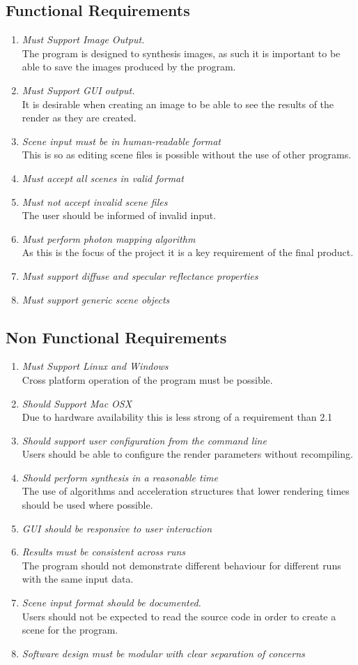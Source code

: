 \newcommand{\req}[2]
{
	\item {\it #1} \hfill \\ #2
}
  
\subsection{Functional Requirements}

\begin{enumerate}[{1}.1]
	\req{Must Support Image Output.}
	{
		The program is designed to synthesis images, as such it is important to be able to
		save the images produced by the program.
	}

	\req{Must Support GUI output.}
	{
		It is desirable when creating an image to be able to see the results of the render as they are created.
	}
	\req{Scene input must be in human-readable format}
	{
		This is so as editing scene files is possible without the use of other programs.
	}

	\req{Must accept all scenes in valid format}
	{
	}

	\req{Must not accept invalid scene files}
	{
		The user should be informed of invalid input.
	}

	\req{Must perform photon mapping algorithm}
	{
		As this is the focus of the project it is a key requirement of the final product.
	}

	\req{Must support diffuse and specular reflectance properties}

	\req{Must support generic scene objects}
\end{enumerate}

\subsection{Non Functional Requirements}

\begin{enumerate}[{2}.1]
	\req{Must Support Linux and Windows}
	{
		Cross platform operation of the program must be possible.
	}
	\req{Should Support Mac OSX}
	{
		Due to hardware availability this is less strong of a requirement than 2.1
	}
	\req{Should support user configuration from the command line}
	{
		Users should be able to configure the render parameters without recompiling.
	}
	\req{Should perform synthesis in a reasonable time}
	{
		The use of algorithms and acceleration structures that lower rendering times
		should be used where possible.
	}
	\req{GUI should be responsive to user interaction}{}
	\req{Results must be consistent across runs}
	{
		The program should not demonstrate different behaviour for different runs with
		the same input data.
	}
	\req{Scene input format should be documented.}
	{
		Users should not be expected to read the source code in order to create
		a scene for the program.
	}
	\req{Software design must be modular with clear separation of concerns}
\end{enumerate}
